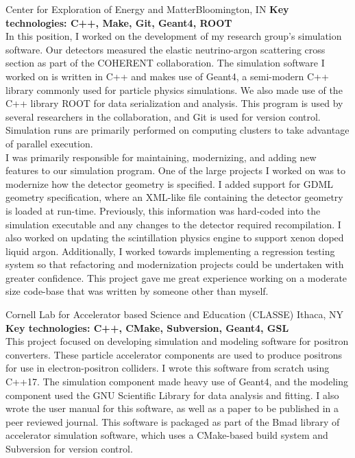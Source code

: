 \documentclass[11pt,a4paper,sans]{moderncv}        %
\newcommand{\techlist}[1]{\textbf{Key technologies: {#1}}\\}
\begin{document}
{}%
{Center for Exploration of Energy and Matter}{Bloomington, IN}{
\techlist{C++, Make, Git, Geant4, ROOT}
\hspace*{1em}
In this position, I worked on the development of my research group's simulation software.
Our detectors measured the elastic neutrino-argon scattering cross section as part of the COHERENT collaboration.
The simulation software I worked on is written in C++ and makes use of Geant4, a semi-modern C++ library commonly used for particle physics simulations.
We also made use of the C++ library ROOT for data serialization and analysis.
This program is used by several researchers in the collaboration, and Git is used for version control.
Simulation runs are primarily performed on computing clusters to take advantage of parallel execution.
\\ \hspace*{1em}
I was primarily responsible for maintaining, modernizing, and adding new features to our simulation program.
One of the large projects I worked on was to modernize how the detector geometry is specified.
I added support for GDML geometry specification, where an XML-like file containing the detector geometry is loaded at run-time.
Previously, this information was hard-coded into the simulation executable and any changes to the detector required recompilation.
I also worked on updating the scintillation physics engine to support xenon doped liquid argon.
Additionally, I worked towards implementing a regression testing system so that refactoring and modernization projects could be undertaken with greater confidence.
This project gave me great experience working on a moderate size code-base that was written by someone other than myself.
}%

{}%
{Cornell Lab for Accelerator based Science and Education (CLASSE)}
{Ithaca, NY}{
\techlist{C++, CMake, Subversion, Geant4, GSL}
\hspace*{1em}
This project focused on developing simulation and modeling software for positron converters.
These particle accelerator components are used to produce positrons for use in electron-positron colliders.
I wrote this software from scratch using C++17.
The simulation component made heavy use of Geant4, and the modeling component used the GNU Scientific Library for data analysis and fitting.
I also wrote the user manual for this software, as well as a paper to be published in a peer reviewed journal.
This software is packaged as part of the Bmad library of accelerator simulation software, which uses a CMake-based build system and Subversion for version control.
}%
\end{document}
